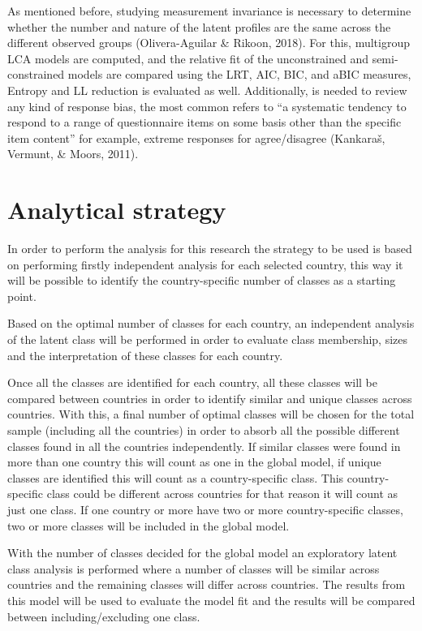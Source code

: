 \documentclass[12pt,a4paper,oneside]{reedthesis}
\begin{document}
As mentioned before, studying measurement invariance is necessary to determine whether the number and nature of the latent profiles are the same across the different observed groups (Olivera-Aguilar \& Rikoon, 2018). For this, multigroup LCA models are computed, and the relative fit of the unconstrained and semi-constrained models are compared using the LRT, AIC, BIC, and aBIC measures, Entropy and LL reduction is evaluated as well. Additionally, is needed to review any kind of response bias, the most common refers to ``a systematic tendency to respond to a range of questionnaire items on some basis other than the specific item content'' for example, extreme responses for agree/disagree (Kankaraš, Vermunt, \& Moors, 2011).

\hypertarget{analytical-strategy}{%
\section{Analytical strategy}\label{analytical-strategy}}

In order to perform the analysis for this research the strategy to be used is based on performing firstly independent analysis for each selected country, this way it will be possible to identify the country-specific number of classes as a starting point.

Based on the optimal number of classes for each country, an independent analysis of the latent class will be performed in order to evaluate class membership, sizes and the interpretation of these classes for each country.

Once all the classes are identified for each country, all these classes will be compared between countries in order to identify similar and unique classes across countries. With this, a final number of optimal classes will be chosen for the total sample (including all the countries) in order to absorb all the possible different classes found in all the countries independently. If similar classes were found in more than one country this will count as one in the global model, if unique classes are identified this will count as a country-specific class. This country-specific class could be different across countries for that reason it will count as just one class. If one country or more have two or more country-specific classes, two or more classes will be included in the global model.

With the number of classes decided for the global model an exploratory latent class analysis is performed where a number of classes will be similar across countries and the remaining classes will differ across countries. The results from this model will be used to evaluate the model fit and the results will be compared between including/excluding one class.
\end{document}
